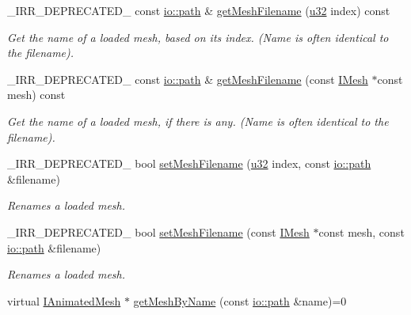 \begin{DoxyCompactItemize}
\+\_\+\+I\+R\+R\+\_\+\+D\+E\+P\+R\+E\+C\+A\+T\+E\+D\+\_\+ const \hyperlink{namespaceirr_1_1io_a6468281622ce3a1c46b72e19f32dded5}{io\+::path} \& \hyperlink{classirr_1_1scene_1_1IMeshCache_afda96c4fb8ab272f3d3688dcaef3abc3}{get\+Mesh\+Filename} (\hyperlink{namespaceirr_a0416a53257075833e7002efd0a18e804}{u32} index) const
\begin{DoxyCompactList}\small\item\em Get the name of a loaded mesh, based on its index. (Name is often identical to the filename). \end{DoxyCompactList}\item 
\+\_\+\+I\+R\+R\+\_\+\+D\+E\+P\+R\+E\+C\+A\+T\+E\+D\+\_\+ const \hyperlink{namespaceirr_1_1io_a6468281622ce3a1c46b72e19f32dded5}{io\+::path} \& \hyperlink{classirr_1_1scene_1_1IMeshCache_adc17a943cd79a94710def8dd7d2de605}{get\+Mesh\+Filename} (const \hyperlink{classirr_1_1scene_1_1IMesh}{I\+Mesh} $\ast$const mesh) const
\begin{DoxyCompactList}\small\item\em Get the name of a loaded mesh, if there is any. (Name is often identical to the filename). \end{DoxyCompactList}\item 
\+\_\+\+I\+R\+R\+\_\+\+D\+E\+P\+R\+E\+C\+A\+T\+E\+D\+\_\+ bool \hyperlink{classirr_1_1scene_1_1IMeshCache_a5b87031dbfdb70a59c00a1b892b74c3d}{set\+Mesh\+Filename} (\hyperlink{namespaceirr_a0416a53257075833e7002efd0a18e804}{u32} index, const \hyperlink{namespaceirr_1_1io_a6468281622ce3a1c46b72e19f32dded5}{io\+::path} \&filename)
\begin{DoxyCompactList}\small\item\em Renames a loaded mesh. \end{DoxyCompactList}\item 
\+\_\+\+I\+R\+R\+\_\+\+D\+E\+P\+R\+E\+C\+A\+T\+E\+D\+\_\+ bool \hyperlink{classirr_1_1scene_1_1IMeshCache_a9b7770a23859ddd045b3c22dfbecbcaf}{set\+Mesh\+Filename} (const \hyperlink{classirr_1_1scene_1_1IMesh}{I\+Mesh} $\ast$const mesh, const \hyperlink{namespaceirr_1_1io_a6468281622ce3a1c46b72e19f32dded5}{io\+::path} \&filename)
\begin{DoxyCompactList}\small\item\em Renames a loaded mesh. \end{DoxyCompactList}\item 
virtual \hyperlink{classirr_1_1scene_1_1IAnimatedMesh}{I\+Animated\+Mesh} $\ast$ \hyperlink{classirr_1_1scene_1_1IMeshCache_a4c93e736bdca8c84d478afc82540d6bb}{get\+Mesh\+By\+Name} (const \hyperlink{namespaceirr_1_1io_a6468281622ce3a1c46b72e19f32dded5}{io\+::path} \&name)=0

\end{DoxyCompactItemize}
